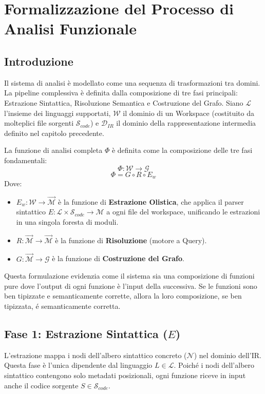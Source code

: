 \chapter{Formalizzazione del Processo di Analisi Funzionale}
\section{Introduzione}
Il sistema di analisi è modellato come una sequenza di trasformazioni
tra domini. La pipeline complessiva è definita dalla composizione di
tre fasi principali: Estrazione Sintattica, Risoluzione Semantica e
Costruzione del Grafo.
Siano $\mathcal{L}$ l'insieme dei linguaggi supportati,
$\mathcal{W}$ il dominio di un Workspace (costituito da molteplici
file sorgenti $\mathcal{S}_{code}$) e
$\mathcal{D}_{IR}$ il dominio della rappresentazione intermedia
definito nel capitolo precedente.

La funzione di analisi completa $\Phi$ è definita come la
composizione delle tre fasi fondamentali:
$$\Phi : \mathcal{W} \to \mathcal{G}$$
$$\Phi = G \circ R \circ E_{w}$$
Dove:
\begin{itemize}
  \item $E_{w} : \mathcal{W} \to \vec{\mathcal{M}}$ è la funzione di
    \textbf{Estrazione Olistica}, che applica il parser sintattico $E
    : \mathcal{L} \times \mathcal{S}_{code} \to \mathcal{M}$ a ogni
    file del workspace, unificando le estrazioni in una singola
    foresta di moduli.
  \item $R : \vec{\mathcal{M}} \to \vec{\mathcal{M}}$ è la funzione di
    \textbf{Risoluzione} (motore a Query).
  \item $G : \vec{\mathcal{M}} \to \mathcal{G}$ è la funzione di
    \textbf{Costruzione del Grafo}.
\end{itemize}
Questa formulazione evidenzia come il sistema sia una composizione di
funzioni pure dove l'output di ogni funzione è l'input della
successiva. Se le funzioni sono ben tipizzate e semanticamente
corrette, allora la loro composizione, se ben tipizzata, é
semanticamente corretta.

\section{Fase 1: Estrazione Sintattica ($E$)}
L'estrazione mappa i nodi dell'albero sintattico concreto
($\mathcal{N}$) nel dominio dell'IR. Questa fase è l'unica dipendente
dal linguaggio $L \in \mathcal{L}$. Poiché i nodi dell'albero
sintattico contengono solo metadati posizionali, ogni funzione riceve
in input anche il codice sorgente $S \in \mathcal{S}_{code}$.

